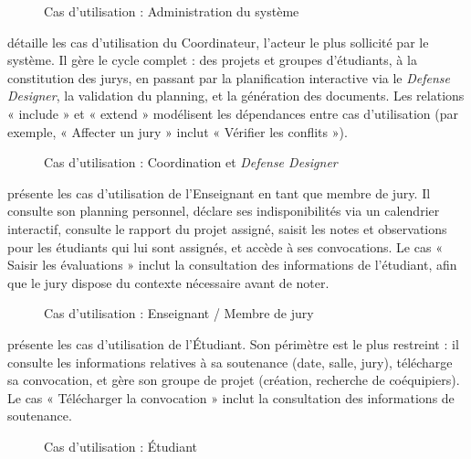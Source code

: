 \begin{figure}[H]
    \centering
    \caption{Cas d'utilisation : Administration du système}
    \label{fig:uc_admin}
\end{figure}

 détaille les cas d'utilisation du Coordinateur, l'acteur le plus sollicité par le système. Il gère le cycle complet : des projets et groupes d'étudiants, à la constitution des jurys, en passant par la planification interactive via le \textit{Defense Designer}, la validation du planning, et la génération des documents. Les relations « include » et « extend » modélisent les dépendances entre cas d'utilisation (par exemple, « Affecter un jury » inclut « Vérifier les conflits »).

\begin{figure}[H]
    \centering
    \caption{Cas d'utilisation : Coordination et \textit{Defense Designer}}
    \label{fig:uc_coordination}
\end{figure}

 présente les cas d'utilisation de l'Enseignant en tant que membre de jury. Il consulte son planning personnel, déclare ses indisponibilités via un calendrier interactif, consulte le rapport du projet assigné, saisit les notes et observations pour les étudiants qui lui sont assignés, et accède à ses convocations. Le cas « Saisir les évaluations » inclut la consultation des informations de l'étudiant, afin que le jury dispose du contexte nécessaire avant de noter.

\begin{figure}[H]
    \centering
    \caption{Cas d'utilisation : Enseignant / Membre de jury}
    \label{fig:uc_jury}
\end{figure}

 présente les cas d'utilisation de l'Étudiant. Son périmètre est le plus restreint : il consulte les informations relatives à sa soutenance (date, salle, jury), télécharge sa convocation, et gère son groupe de projet (création, recherche de coéquipiers). Le cas « Télécharger la convocation » inclut la consultation des informations de soutenance.

\begin{figure}[H]
    \centering
    \caption{Cas d'utilisation : Étudiant}
    \label{fig:uc_student}
\end{figure}

